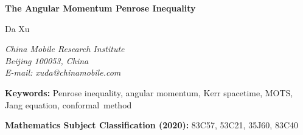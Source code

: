 \documentclass[12pt]{article}
\theoremstyle{plain}
\theoremstyle{definition}
\theoremstyle{remark}
\newcommand{\ADM}{\mathrm{ADM}}
\begin{document}

\begin{center}
{\LARGE\bfseries The Angular Momentum Penrose Inequality}

\vspace{1cm}

{\large Da Xu}

\vspace{0.3cm}

{\itshape China Mobile Research Institute\\
Beijing 100053, China\\
E-mail: xuda@chinamobile.com}

\vspace{0.3cm}

\end{center}

\vspace{1cm}
\begin{abstract}
We establish the Penrose inequality with angular momentum for asymptotically flat, axisymmetric vacuum initial data containing a strictly stable marginally outer trapped surface. Specifically, if $(M^3, g, K)$ satisfies the dominant energy condition and $\Sigma$ denotes the outermost MOTS with area $A$ and Komar angular momentum $J$, then
\[
M_{\ADM} \geq \sqrt{\frac{A}{16\pi} + \frac{4\pi J^2}{A}},
\]
with equality characterizing slices of Kerr. The argument combines the Jang equation approach of Bray--Khuri and Han--Khuri with the $p$-harmonic level set method of Agostiniani--Mazzieri--Oronzio. A central role is played by a modified Hawking mass that incorporates angular momentum and remains monotone along the flow. The conservation of $J$ under this flow relies on the vacuum hypothesis through a cohomological argument. We also characterize the equality case using the Mars--Simon tensor.
\end{abstract}

\vspace{0.5cm}
\noindent\textbf{Keywords:} Penrose inequality, angular momentum, Kerr spacetime, MOTS, Jang equation, conformal~method

\vspace{0.3cm}
\noindent\textbf{Mathematics Subject Classification (2020):} 83C57, 53C21, 35J60, 83C40
\end{document}
